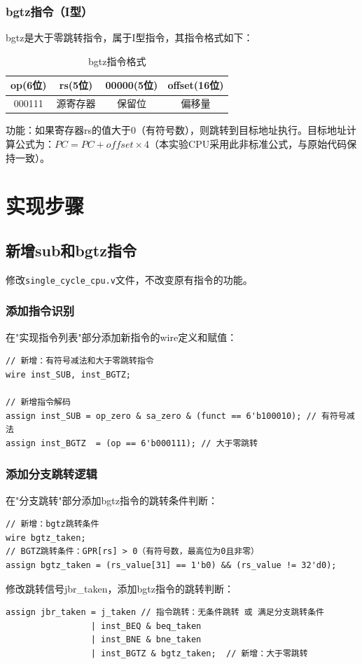 \documentclass[12pt,a4paper]{article}
\begin{document}
\subsubsection{bgtz指令（I型）}
bgtz是大于零跳转指令，属于I型指令，其指令格式如下：
\begin{table}[H]
\centering
\begin{tabular}{|c|c|c|c|}
\hline
op(6位) & rs(5位) & 00000(5位) & offset(16位) \\
\hline
000111 & 源寄存器 & 保留位 & 偏移量 \\
\hline
\end{tabular}
\caption{bgtz指令格式}
\end{table}
功能：如果寄存器rs的值大于0（有符号数），则跳转到目标地址执行。目标地址计算公式为：$PC = PC + offset \times 4$（本实验CPU采用此非标准公式，与原始代码保持一致）。

\section{实现步骤}
\subsection{新增sub和bgtz指令}
修改\texttt{single\_cycle\_cpu.v}文件，不改变原有指令的功能。

\subsubsection{添加指令识别}
在"实现指令列表"部分添加新指令的wire定义和赋值：
\begin{lstlisting}
// 新增：有符号减法和大于零跳转指令
wire inst_SUB, inst_BGTZ;  

// 新增指令解码
assign inst_SUB = op_zero & sa_zero & (funct == 6'b100010); // 有符号减法
assign inst_BGTZ  = (op == 6'b000111); // 大于零跳转
\end{lstlisting}

\subsubsection{添加分支跳转逻辑}
在"分支跳转"部分添加bgtz指令的跳转条件判断：
\begin{lstlisting}
// 新增：bgtz跳转条件
wire bgtz_taken;
// BGTZ跳转条件：GPR[rs] > 0（有符号数，最高位为0且非零）
assign bgtz_taken = (rs_value[31] == 1'b0) && (rs_value != 32'd0);
\end{lstlisting}

修改跳转信号jbr\_taken，添加bgtz指令的跳转判断：
\begin{lstlisting}
assign jbr_taken = j_taken // 指令跳转：无条件跳转 或 满足分支跳转条件
                 | inst_BEQ & beq_taken
                 | inst_BNE & bne_taken
                 | inst_BGTZ & bgtz_taken;  // 新增：大于零跳转
\end{lstlisting}
\end{document}
